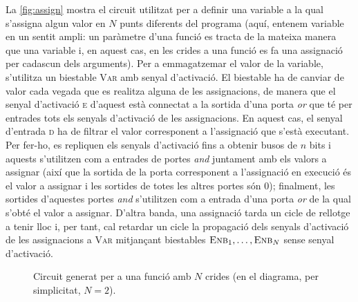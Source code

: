 La \autoref{fig:assign} mostra el circuit utilitzat per a definir una variable 
a la qual s'assigna algun valor en \(N\) punts diferents del 
programa (aquí, entenem variable en un sentit ampli: un paràmetre d'una funció 
es tracta de la mateixa manera que una variable i, en aquest cas, en les 
crides a una funció es fa una assignació per cadascun dels arguments). Per a 
emmagatzemar el valor de la variable, s'utilitza un biestable \textsc{Var} amb 
senyal d'activació. El biestable ha de canviar de valor cada vegada que es 
realitza alguna de les assignacions, de manera que el senyal d'activació 
\textsc{e} d'aquest està connectat a la sortida d'una porta \textit{or} 
que té per entrades tots els senyals d'activació de les assignacions. En 
aquest cas, el senyal d'entrada \textsc{d} ha de filtrar el valor corresponent 
a l'assignació que s'està executant. Per fer-ho, es repliquen els senyals 
d'activació fins a obtenir busos de \(n\) bits i aquests s'utilitzen com a 
entrades de portes \textit{and} juntament amb els valors a assignar (així 
que la sortida de la porta corresponent a l'assignació en execució és el valor 
a assignar i les sortides de totes les altres portes són 0); finalment, les 
sortides d'aquestes portes \textit{and} s'utilitzen com a entrada d'una porta 
\textit{or} de la qual s'obté el valor a assignar. D'altra banda, una 
assignació tarda un cicle de rellotge a tenir lloc i, per tant, cal retardar 
un cicle la propagació dels senyals d'activació de les assignacions a 
\textsc{Var} mitjançant biestables \(\textsc{Enb}_1,\ldots,\textsc{Enb}_N\)
sense senyal d'activació.

\begin{figure}[ht]
    \centering
    
    \caption{Circuit generat per a una funció amb \(N\) crides 
        (en el diagrama, per simplicitat, \(N=2\)).}
    \label{fig:func}
\end{figure}

